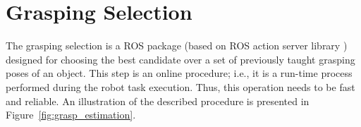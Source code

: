 

\section{Grasping Selection}
\label{cap4:modular_grasping_architecture:sec:grasp_selection}

The grasping selection is a \ac{ROS} package (based on \ac{ROS} action server library \cite{ros_action_lib}) designed for choosing the best candidate over a set of previously taught grasping poses of an object. This step is an online procedure; i.e., it is a run-time process performed during the robot task execution. Thus, this operation needs to be fast and reliable. An illustration of the described procedure is presented in Figure~\ref{fig:grasp_estimation}. 

\begin{figure}[h!]
\end{figure}


